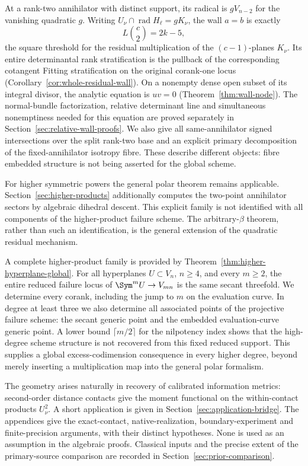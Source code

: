 At a rank-two annihilator with distinct support, its radical is
$gV_{n-2}$ for the vanishing quadratic $g$. Writing
$U_\nu\cap\operatorname{rad}H_\ell=gK_\nu$, the wall $a=b$
is exactly
\[
 L\binom c2=2k-5,
\]
the square threshold for the residual multiplication of the
$(c-1)$-planes $K_\nu$. Its entire determinantal rank stratification
is the pullback of the corresponding cotangent Fitting stratification
on the original corank-one locus
(Corollary~\ref{cor:whole-residual-wall}). On a nonempty dense
open subset of its integral divisor, the analytic equation is $uv=0$
(Theorem~\ref{thm:wall-node}). The normal-bundle factorization,
relative determinant line and simultaneous nonemptiness needed for
this equation are proved separately in
Section~\ref{sec:relative-wall-proofs}. We also give all
same-annihilator signed intersections over the split rank-two base
and an explicit primary decomposition of the fixed-annihilator
isotropy fibre. These describe different objects: fibre embedded
structure is not being asserted for the global scheme.

For higher symmetric powers the general polar theorem remains
applicable. Section~\ref{sec:higher-products} additionally computes
the two-point annihilator sectors by algebraic dihedral descent.
This explicit family is not identified with all components of the
higher-product failure scheme. The arbitrary-$\beta$ theorem,
rather than such an identification, is the general extension of the
quadratic residual mechanism.

A complete higher-product family is provided by
Theorem~\ref{thm:higher-hyperplane-global}. For all hyperplanes
$U\subset V_n$, $n\ge4$, and every $m\ge2$, the entire reduced
failure locus of $\Sym^mU\to V_{mn}$ is the same secant threefold.
We determine every corank, including the jump to $m$ on the evaluation
curve. In degree at least three we also determine all associated
points of the projective failure scheme: the secant generic point
and the embedded evaluation-curve generic point. A lower bound
$\lceil m/2\rceil$ for the nilpotency index shows that the high-degree
scheme structure is not recovered from this fixed reduced support.
This supplies a global excess-codimension consequence in every higher
degree, beyond merely inserting a multiplication map into the general
polar formalism.

The geometry arises naturally in recovery of calibrated information
metrics: second-order distance contacts give the moment functional
on the within-contact products $U_\nu^2$. A short application is
given in Section~\ref{sec:application-bridge}. The appendices give the exact-contact, native-realization,
boundary-experiment and finite-precision arguments, with their
distinct hypotheses. None
is used as an assumption in the algebraic proofs. Classical inputs
and the precise extent of the primary-source comparison are recorded
in Section~\ref{sec:prior-comparison}.
